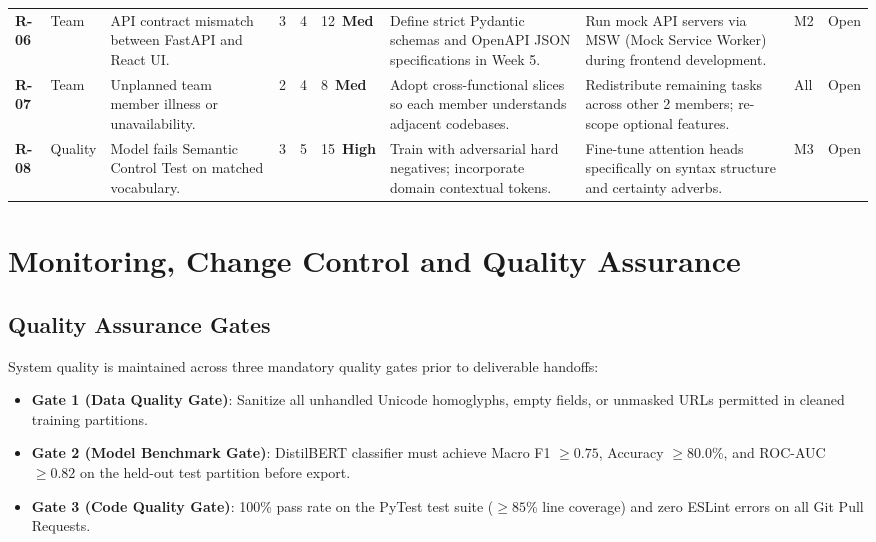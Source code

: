 \documentclass[11pt, a4paper]{article}
\newcommand{\badgeHigh}{\colorbox{mustRedBg}{\textcolor{mustRedText}{\scriptsize\textsf{\textbf{High}}}}}
\newcommand{\badgeMed}{\colorbox{shouldAmberBg}{\textcolor{shouldAmberText}{\scriptsize\textsf{\textbf{Med}}}}}
\begin{document}
\begin{table}[H]
\begin{tabularx}{\textwidth}{@{}C{0.8cm} C{1.2cm} Y C{0.5cm} C{0.5cm} C{1.3cm} Y Y C{0.7cm} C{1.0cm}@{}}
    \textbf{R-06} & Team & API contract mismatch between FastAPI and React UI. & 3 & 4 & 12~\badgeMed & Define strict Pydantic schemas and OpenAPI JSON specifications in Week 5. & Run mock API servers via MSW (Mock Service Worker) during frontend development. & M2 & Open \\
    \textbf{R-07} & Team & Unplanned team member illness or unavailability. & 2 & 4 & 8~\badgeMed & Adopt cross-functional slices so each member understands adjacent codebases. & Redistribute remaining tasks across other 2 members; re-scope optional features. & All & Open \\
    \textbf{R-08} & Quality & Model fails Semantic Control Test on matched vocabulary. & 3 & 5 & 15~\badgeHigh & Train with adversarial hard negatives; incorporate domain contextual tokens. & Fine-tune attention heads specifically on syntax structure and certainty adverbs. & M3 & Open \\
    \bottomrule
  \end{tabularx}
\end{table}

\section{Monitoring, Change Control and Quality Assurance}
\label{sec:monitoring}

\subsection{Quality Assurance Gates}
System quality is maintained across three mandatory quality gates prior to deliverable handoffs:
\begin{itemize}
  \item \textbf{Gate 1 (Data Quality Gate)}: Sanitize all unhandled Unicode homoglyphs, empty fields, or unmasked URLs permitted in cleaned training partitions.
  \item \textbf{Gate 2 (Model Benchmark Gate)}: DistilBERT classifier must achieve Macro F1 $\ge 0.75$, Accuracy $\ge 80.0$\%, and ROC-AUC $\ge 0.82$ on the held-out test partition before export.
  \item \textbf{Gate 3 (Code Quality Gate)}: 100\% pass rate on the PyTest test suite ($\ge 85$\% line coverage) and zero ESLint errors on all Git Pull Requests.
\end{itemize}
\end{document}
